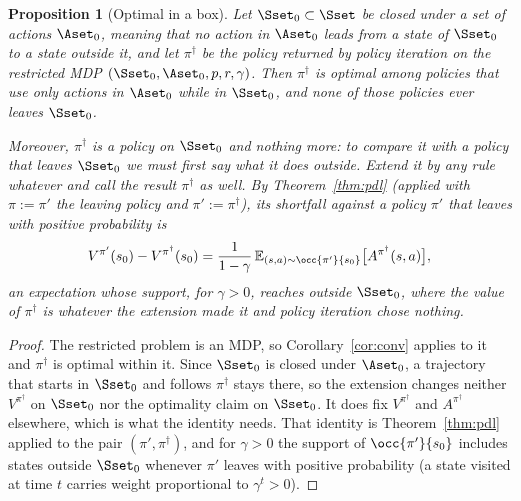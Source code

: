 \documentclass[11pt,a4paper]{article}
\newcommand{\E}{\mathbb{E}}
\theoremstyle{plain}
\newtheorem{proposition}[theorem]{Proposition}
\theoremstyle{definition}
\theoremstyle{remark}
\begin{document}
\begin{proposition}[Optimal in a box]\label{prop:box}
Let $\Sset_0\subset\Sset$ be closed under a set of actions $\Aset_0$, meaning that no action in $\Aset_0$ leads from a state of $\Sset_0$ to a state outside it, and let $\pi^\dagger$ be the policy returned by policy iteration on the restricted MDP $(\Sset_0,\Aset_0,p,r,\gamma)$. Then $\pi^\dagger$ is optimal among policies that use only actions in $\Aset_0$ while in $\Sset_0$, and none of those policies ever leaves $\Sset_0$.

Moreover, $\pi^\dagger$ is a policy on $\Sset_0$ and nothing more: to compare it with a policy that leaves $\Sset_0$ we must first say what it does outside. Extend it by any rule whatever and call the result $\pi^\dagger$ as well. By Theorem~\ref{thm:pdl} (applied with $\pi:=\pi'$ the leaving policy and $\pi':=\pi^\dagger$), its shortfall against a policy $\pi'$ that leaves with positive probability is
\[
V^{\pi'}(s_0)-V^{\pi^\dagger}(s_0)=\frac1{1-\gamma}\,\E_{(s,a)\sim\occ{\pi'}{s_0}}\big[A^{\pi^\dagger}(s,a)\big],
\]
an expectation whose support, for $\gamma>0$, reaches outside $\Sset_0$, where the value of $\pi^\dagger$ is whatever the extension made it and policy iteration chose nothing.
\end{proposition}
\begin{proof}
The restricted problem is an MDP, so Corollary~\ref{cor:conv} applies to it and $\pi^\dagger$ is optimal within it. Since $\Sset_0$ is closed under $\Aset_0$, a trajectory that starts in $\Sset_0$ and follows $\pi^\dagger$ stays there, so the extension changes neither $V^{\pi^\dagger}$ on $\Sset_0$ nor the optimality claim on $\Sset_0$. It does fix $V^{\pi^\dagger}$ and $A^{\pi^\dagger}$ elsewhere, which is what the identity needs. That identity is Theorem~\ref{thm:pdl} applied to the pair $(\pi',\pi^\dagger)$, and for $\gamma>0$ the support of $\occ{\pi'}{s_0}$ includes states outside $\Sset_0$ whenever $\pi'$ leaves with positive probability (a state visited at time $t$ carries weight proportional to $\gamma^t>0$).
\end{proof}
\end{document}
